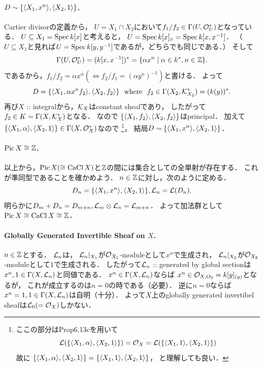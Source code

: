 \documentclass[a4paper]{jsarticle}
\newcommand{\CaCl}{\operatorname{CaCl}}
\newcommand{\Pic}{\operatorname{Pic}}
\begin{document}
    \paragraph{$D \sim \{ \langle X_1,x^n \rangle, \langle X_2,1 \rangle \}$.}
    Cartier divisorの定義から，
    $U=X_1 \cap X_2$において$f_1/f_2 \in \Gamma(U, \mathcal{O}_U^*)$となっている．
    $U \subseteq X_1=\operatorname{Spec} k[x]$と考えると，
    $U=\operatorname{Spec} k[x]_x=\operatorname{Spec} k[x, x^{-1}]$．
    （$U \subseteq X_1$と見れば$U=\operatorname{Spec} k[y,y^{-1}]$であるが，どちらでも同じである．）
    そして
    \[ \Gamma(U, \mathcal{O}_U^*)=(k[x, x^{-1}])^*=\{ \alpha x^{n} \mid \alpha \in k^*, n \in \mathbb{Z} \}. \]
    であるから，$f_1/f_2=\alpha x^{n} (\iff f_2/f_1=(\alpha y^n)^{-1})$と書ける．
    よって
    \[
        D
        =\{ \langle X_1,\alpha x^n f_2 \rangle, \langle X_2,f_2 \rangle \}
        ~~\text{where}~~
        f_2 \in \Gamma(X_2, \mathcal{K}_{X_2}^*)=(k(y))^*.
    \]
    再び$X$ :: integralから，$\mathcal{K}_X$はconstant sheafであり，
    したがって$f_2 \in K=\Gamma(X, \mathcal{K}_X^*)$となる．
    なので
    $\{ \langle X_1,f_2 \rangle, \langle X_2,f_2 \rangle \}$はprincipal．
    加えて$\{ \langle X_1,\alpha \rangle, \langle X_2,1 \rangle \} \in \Gamma(X, \mathcal{O}_X^*)$なので
    \footnote
    {
        ここの部分はProp6.13cを用いて
        \[
            \mathcal{L}(\{ \langle X_1,\alpha \rangle, \langle X_2,1 \rangle \})
            =\mathcal{O}_X
            =\mathcal{L}(\{ \langle X_1,1 \rangle, \langle X_2,1 \rangle \})
        \]
        故に
        $\{ \langle X_1,\alpha \rangle, \langle X_2,1 \rangle \}
            =\{ \langle X_1,1 \rangle, \langle X_2,1 \rangle \}$，
        と理解しても良い．

    }，
    結局$D \sim \{ \langle X_1,x^n \rangle, \langle X_2,1 \rangle \}$．

    \paragraph{$\Pic X \iso \Z$.}
    以上から，$\Pic X(\iso \CaCl X)$と$\mathbb{Z}$の間には集合としての全単射が存在する．
    これが準同型であることを確かめよう．
    $n \in \mathbb{Z}$に対し，次のように定める．
    \[ D_n=\{ \langle X_1,x^n \rangle, \langle X_2,1 \rangle \}, \mathcal{L}_n=\mathcal{L}(D_n). \]
    明らかに$D_m+D_n=D_{m+n}, \mathcal{L}_m \otimes \mathcal{L}_n=\mathcal{L}_{m+n}$．
    よって加法群として$\Pic X \iso \CaCl X \iso \Z$．

    \paragraph{Globally Generated Invertible Sheaf on $X$.}
    $n \in \mathbb{Z}$とする．
    $\mathcal{L}_n$は，
    $\mathcal{L}_n|_{X_1}$が$\mathcal{O}_{X_1}$-moduleとして$x^n$で生成され，
    $\mathcal{L}_n|_{X_2}$が$\mathcal{O}_{X_2}$-moduleとして$1$で生成される．
    したがって$\mathcal{L}_n$ :: generated by global sectionは
    $x^n, 1 \in \Gamma(X, \mathcal{L}_n)$と同値である．
    $x^n \in \Gamma(X, \mathcal{L}_n)$ならば
    $x^n \in \mathcal{O}_{X, O_2}=k[y]_{(y)}$となるが，
    これが成立するのは$n=0$の時である（必要）．
    逆に$n=0$ならば$x^n=1,1 \in \Gamma(X, \mathcal{L}_n)$は自明（十分）．
    よって$X$上のglobally generated invertibel sheafは$\mathcal{L}_0(=\mathcal{O}_X)$しかない．
\end{document}
